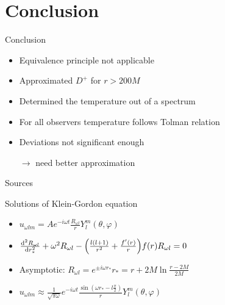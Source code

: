 \documentclass{beamer}
\begin{document}
\section{Conclusion}
\begin{frame}{Conclusion}
\begin{itemize}
	\item Equivalence principle not applicable
	\item Approximated \(D^+\) for \(r > 200M\)
	\item Determined the temperature out of a spectrum
	\item For all observers temperature follows Tolman relation
	\item Deviations not significant enough
	\item[\(\to\)] need better approximation
\end{itemize}
\end{frame}

\begin{frame}{Sources}
\printbibliography
\end{frame}

\begin{frame}
\maketitle
\end{frame}

\begin{frame}{Solutions of Klein-Gordon equation \cite{davies}}
\begin{itemize}
	\item \(u_{\omega l m} = A e^{-i\omega t} \frac{R_{\omega l}}{r}Y_l^m (\theta, \varphi)\)
	\item[]
	\item \(\dv[2]{R_{\omega l}}{r_*} + \omega^2 R_{\omega l} -\qty(\frac{l(l+1)}{r^2} + \frac{f'(r)}{r})f(r) R_{\omega l} = 0\)
	\item[]
	\item Asymptotic: \(R_{\omega l} = e^{\pm i\omega r_*}\)\hspace{3cm}\(r_* = r + 2M \ln \frac{r-2M}{2M}\)
	\item[]	
	\item \(u_{\omega l m} \approx \frac{1}{\sqrt{\pi\omega}} e^{-i\omega t} \frac{\sin(\omega r_* - l\frac{\pi}{2})}{r} Y_l^m (\theta, \varphi)\) 
\end{itemize}
\end{frame}
\end{document}
